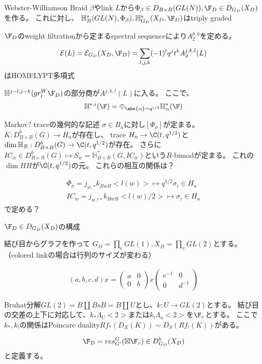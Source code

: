 \documentclass[dvipdfmx]{beamer}
\begin{document}
\begin{frame}{Webster-Williamson}
  Braid $\beta$やlink $L$から$\Phi_\beta\in D_{B\times B}(GL(N)), \F_D\in D_{G_D}(X_D)$を作る。
  これに対し、
  $\mathbb{H}^*_B(GL(N),\Phi_\beta), \mathbb{H}^*_{G_D}(X_D,\F_D)$はtriply graded

  $\F_D$のweight filtrationから定まるspectral sequenceにより$A_2^{p,q}$を定める。
  \begin{thm}
    \begin{align*}
      \mathcal{E}(L)=\mathcal{E}_{G_D}(X_D,\F_D)=\sum_{l,j,k}(-1)^lq^jt^kA_2^{j,k,l}(L)
    \end{align*}
    はHOMFLYPT多項式
  \end{thm}

  $\mathbb{H}^{j-l,j-k}(gr_l^W\F_D)$の部分商が$A^{j,k,l}(L)$に入る。
  ここで、
  \begin{align*}
    \mathbb{H}^{*,i}(\F)=\oplus_{\abs{\alpha}=q^{i/2}}\mathbb{H}^*_\alpha(\F)
  \end{align*}
\end{frame}

\begin{frame}{Markov? traceの幾何的な記述}
  $\sigma\in B_n$に対し$[\Phi_\sigma]$が定まる。
  $K:D^b_{B\times B}(G)\to H_n$が存在し、
  trace $H_n \to \C(t,q^{1/2})$と$\dim \mathbb{H}_B:D^b_{B\times B}(G) \to \C(t,q^{1/2})$が存在。
  さらに$IC_w \in D^b_{B\times B}(G) \mapsto S_w=\mathbb{H}^*_{B\times B}(G, IC_w)$という$R$-bimodが定まる。
  これの$\dim HH$が$\C(t,q^{1/2})$の元。
  これらの相互の関係は？

  \begin{align*}
    \Phi_\sigma=j_{w,*}k_{BwB}<l(w)>\mapsto q^{1/2}\sigma_i\in H_n\\
    IC_w=j_{w,!*}k_{BwB}<l(w)/2>\mapsto \sigma_i\in H_n
  \end{align*}
  で定める？
\end{frame}

\begin{frame}
  $\F_D\in D_{G_D}(X_D)$の構成

  結び目からグラフを作って
  $G_D=\prod_e GL(1), X_D=\prod_v GL(2)$とする。
  （colored linkの場合は行列のサイズが変わる）
  
  \begin{align*}
    (a,b,c,d)x=\begin{pmatrix}a&0\\0&b\end{pmatrix}x\begin{pmatrix}c^{-1}&0\\0&d^{-1}\end{pmatrix}
  \end{align*}
  
  Bruhat分解$GL(2)=B\amalg BsB=B\amalg U$とし、$k:U \to GL(2)$とする。
  結び目の交差の上下に対応して、$k_*\Lambda_U<2>$または$k_!\Lambda_u<2>$を$\F_v$とする。
  ここで$k_*, k_!$の関係はPoincare duality$Rf_*(D_X(K))\sim D_S(Rf_!(K))$がある。
  
  \begin{align*}
    \F_D=res^G_{G'}(\boxtimes\F_v)\in D^b_{G_D}(X_D)
  \end{align*}
  と定義する。
\end{frame}
\end{document}
